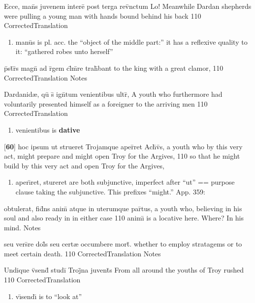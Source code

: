 \latline
  {Ecce, man\={}s juvenem intere\={} post terga rev\={\macron {\i}}nctum}
  { Lo!  Meanwhile Dardan shepherds were pulling a young man with hands bound behind his back }
  {110}
  { CorrectedTranslation }
  { \begin{enumerate}
  	\item man\={u}s is pl. acc. the ``object of the middle part:''  it has a reflexive quality to it: ``gathered robes unto herself''
  \end{enumerate} }


\latline
  {p\={}st\={}r\={}s magn\={} ad r\={}gem cl\={}m\={}re trah\={}bant}
  { to the king with a great clamor,  }
  {110}
  { CorrectedTranslation }
  { Notes }


\latline
  {Dardanid{\ae}, qu\={\macron {\i}} s\={} ign\={}tum venientibus ultr\={},}
  { A youth who furthermore had voluntarily presented himself as a foreigner to the arriving men  }
  {110}
  { CorrectedTranslation }
  { \begin{enumerate}
  	\item venientibus is \textbf{dative}
  \end{enumerate} }


\latline
  {[\textbf{60}] hoc ipsum ut strueret Trojamque aper\={\macron {\i}}ret Ach\={\macron {\i}}v\={\macron {\i}}s,}
  { a youth who by this very act, might prepare and might open Troy for the Argives, }
  {110}
  { so that he might build by this very act and open Troy for the Argives, }
  { \begin{enumerate}
  	\item aper\={\i}ret, stureret are both subjunctive, imperfect after ``ut'' == purpose clause taking the subjunctive.  This prefixes ``might.''  App. 359: 
  \end{enumerate} }


\latline
  {obtulerat, fid\={}ns anim\={\macron {\i}} atque in uterumque par\={}tus,}
  { a youth who, believing in his soul and also ready in in either case }
  {110}
  { anim\={\i} is a locative here.  Where?  In his mind. }
  { Notes }


\latline
  {seu vers\={}re dol\={}s seu cert{\ae} occumbere mort\={\macron {\i}}.}
  { whether to employ stratagems or to meet certain death. }
  {110}
  { CorrectedTranslation }
  { Notes }


\latline
  {Undique v\={\macron {\i}}send\={\macron {\i}} studi\={} Troj\={}na juvent\={}s}
  { From all around the youths of Troy rushed }
  {110}
  { CorrectedTranslation }
  { \begin{enumerate}
  	\item v\={\i}send\={\i} is to ``look at''
  \end{enumerate} }


